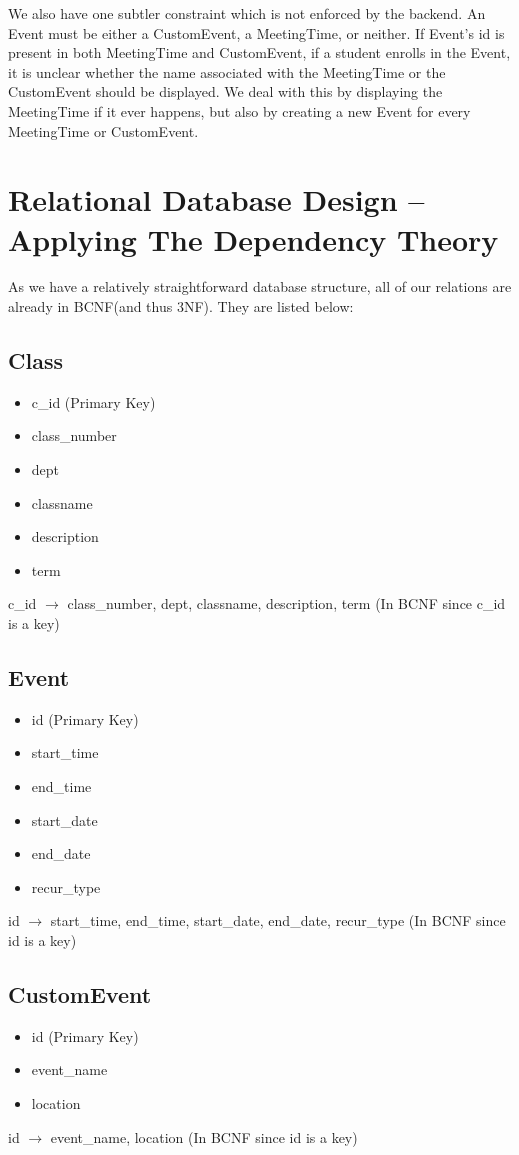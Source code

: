 \documentclass[pdftex,12pt,letter]{article}
\begin{document}
We also have one subtler constraint which is not enforced by the backend.  An Event must be either a CustomEvent, a MeetingTime, or neither.  If Event's id is present in both MeetingTime and CustomEvent, if a student enrolls in the Event, it is unclear whether the name associated with the MeetingTime or the CustomEvent should be displayed.  We deal with this by displaying the MeetingTime if it ever happens, but also by creating a new Event for every MeetingTime or CustomEvent.\\

\section{Relational Database Design -- Applying The Dependency Theory}
As we have a relatively straightforward database structure, all of our relations are already in BCNF(and thus 3NF). They are listed below:
\subsection*{Class}
\begin{itemize}
\item c\_id (Primary Key)
\item class\_number
\item dept
\item classname
\item description
\item term
\end{itemize}
c\_id $\rightarrow$ class\_number, dept, classname, description, term (In BCNF since c\_id is a key)
\subsection*{Event}
\begin{itemize}
\item id (Primary Key)
\item start\_time
\item end\_time
\item start\_date
\item end\_date
\item recur\_type
\end{itemize}
id $\rightarrow$ start\_time, end\_time, start\_date, end\_date, recur\_type (In BCNF since id is a key)
\subsection*{CustomEvent}
\begin{itemize}
\item id (Primary Key)
\item event\_name
\item location
\end{itemize}
id $\rightarrow$ event\_name, location (In BCNF since id is a key)
\end{document}
